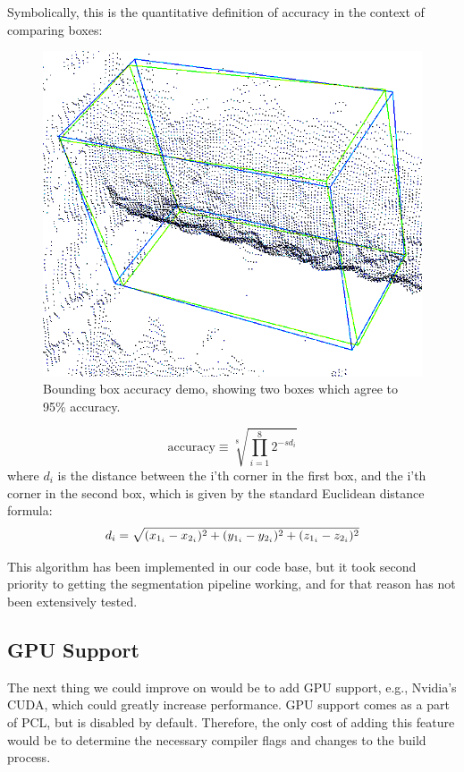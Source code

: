 \documentclass[journal]{IEEEtran}
\begin{document}
Symbolically, this is the quantitative definition of accuracy in the context of comparing boxes:
\begin{figure}
  \includegraphics[scale=0.35]{images/accuracy-image-inverted}
  \caption{Bounding box accuracy demo, showing two boxes which agree to 95\% accuracy.}
\end{figure}


\begin{equation}
	 \text{accuracy} \equiv \sqrt[8]{\prod_{i=1}^{8} 2^{-sd_i}}
\end{equation}
where $d_i$ is the distance between the i'th corner in the first box, and the i'th corner in the second box, which is given by the standard Euclidean distance formula:\\
\begin{equation}
	d_i = \sqrt{(x_{1_i} - x_{2_i})^2 + (y_{1_i} - y_{2_i})^2 + (z_{1_i} - z_{2_i})^2}\\
\end{equation}

This algorithm has been implemented in our code base, but it took second priority to getting the segmentation pipeline working, and for that reason has not been extensively tested.

\subsection{GPU Support}The next thing we could improve on would be to add GPU support, e.g., Nvidia's CUDA, which could greatly increase performance.  GPU support comes as a part of PCL, but is disabled by default.  Therefore, the only cost of adding this feature would be to determine the necessary compiler flags and changes to the build process.
\end{document}
